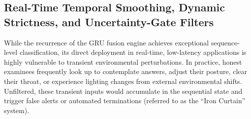 \documentclass[journal]{IEEEtran}
\begin{document}
\subsection{Real-Time Temporal Smoothing, Dynamic Strictness, and Uncertainty-Gate Filters}

While the recurrence of the GRU fusion engine achieves exceptional sequence-level classification, its direct deployment in real-time, low-latency applications is highly vulnerable to transient environmental perturbations. In practice, honest examinees frequently look up to contemplate answers, adjust their posture, clear their throat, or experience lighting changes from external environmental shifts. Unfiltered, these transient inputs would accumulate in the sequential state and trigger false alerts or automated terminations (referred to as the ``Iron Curtain'' system).
\end{document}
